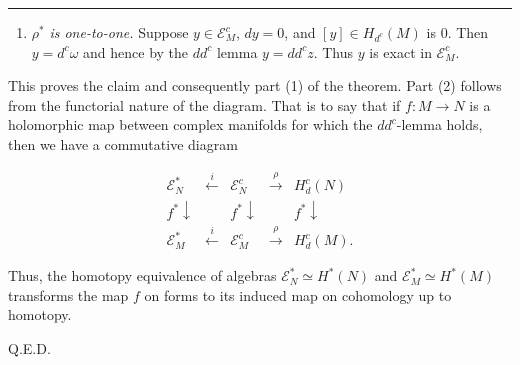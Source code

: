 \documentclass[
  english,
  a3paper,
  a3paper]{extarticle}
\providecommand{\tightlist}{%
  \setlength{\itemsep}{0pt}\setlength{\parskip}{0pt}}
\begin{document}
\clearpage



\par

\vspace{0.7mm}\hrule\vspace{1.6mm}

\fontsize{9}{11}\selectfont

\begin{enumerate}
\def\labelenumi{\alph{enumi})}
\setcounter{enumi}{4}
\tightlist
\item
  \(\rho^*\) \emph{is one-to-one.} Suppose \(y\in\mathcal{E}_M^c\),
  \(dy=0\), and \([y]\in H_{d^c}(M)\) is 0. Then \(y=d^c\omega\) and
  hence by the \(dd^c\) lemma \(y=dd^c z\). Thus \(y\) is exact in
  \(\mathcal{E}_M^c\).
\end{enumerate}

This proves the claim and consequently part (1) of the theorem. Part (2)
follows from the functorial nature of the diagram. That is to say that
if \(f:M\to N\) is a holomorphic map between complex manifolds for which
the \(dd^c\)-lemma holds, then we have a commutative diagram

\[\begin{array}{ccccc}\mathcal{E}_N^* & \xleftarrow{i} & \mathcal{E}_N^c & \xrightarrow{\rho} & H_d^c(N) \\ {\scriptstyle f^*}\downarrow & & {\scriptstyle f^*}\downarrow & & {\scriptstyle f^*}\downarrow \\ \mathcal{E}_M^* & \xleftarrow{i} & \mathcal{E}_M^c & \xrightarrow{\rho} & H_d^c(M).\end{array}\]

Thus, the homotopy equivalence of algebras
\(\mathcal{E}_N^*\simeq H^*(N)\) and \(\mathcal{E}_M^*\simeq H^*(M)\)
transforms the map \(f\) on forms to its induced map on cohomology up to
homotopy.

Q.E.D.
\end{document}
